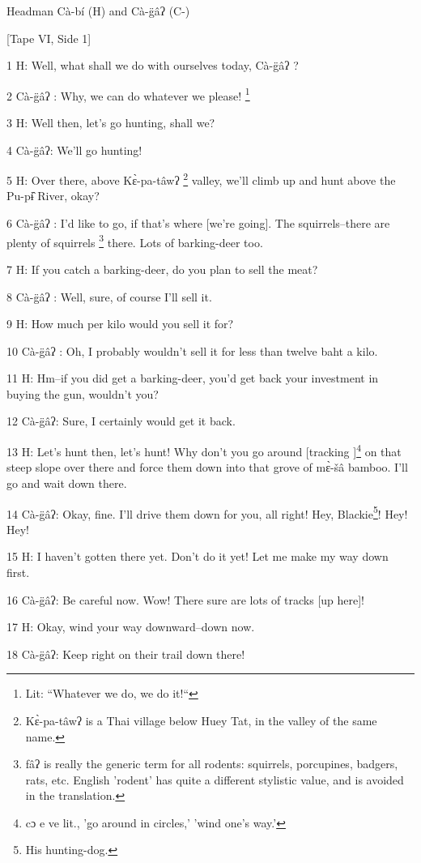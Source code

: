 
Headman Cà-bí (H) and Cà-g̈âʔ (C-)

[Tape VI, Side 1]

1 H: Well, what shall we do with ourselves today, Cà-g̈âʔ ?

2 Cà-g̈âʔ : Why, we can do whatever we please! \footnote{Lit: ``Whatever we do, we do it!``}

3 H: Well then, let's go hunting, shall we?

4 Cà-g̈âʔ: We'll go hunting!

5 H: Over there, above Kɛ̀-pa-tâwʔ \footnote{Kɛ̀-pa-tâwʔ is a Thai village below Huey Tat, in the valley of the same name.} valley, we'll climb up and hunt above
the Pu-pɨ̂ River, okay?

6 Cà-g̈âʔ : I'd like to go, if that's where [we're going]. The squirrels--there
are plenty of squirrels \footnote{fâʔ is really the generic term for all rodents: squirrels, porcupines, badgers, rats, etc. English 'rodent' has quite a different stylistic value, and is avoided in the translation.} there. Lots of barking-deer too.

7 H: If you catch a barking-deer, do you plan to sell the meat?

8 Cà-g̈âʔ : Well, sure, of course I'll sell it.

9 H: How much per kilo would you sell it for?

10 Cà-g̈âʔ : Oh, I probably wouldn't sell it for less than twelve baht a kilo.

11 H: Hm--if you did get a barking-deer, you'd get back your investment in buying
the gun, wouldn't you?

12 Cà-g̈âʔ: Sure, I certainly would get it back.

13 H: Let's hunt then, let's hunt! Why don't you go around [tracking ]\footnote{cɔ e ve lit., 'go around in circles,' 'wind one's way.'} on that
steep slope over there and force them down into that grove of mɛ̀-šâ bamboo.
I'll go and wait down there.

14  Cà-g̈âʔ: Okay, fine. I'll drive them down for you, all right! Hey, Blackie\footnote{His hunting-dog.}!
Hey! Hey!

15 H: I haven't gotten there yet. Don't do it yet! Let me make my way down first.

16  Cà-g̈âʔ: Be careful now. Wow! There sure are lots of tracks [up here]!

17 H: Okay, wind your way downward--down now.

18  Cà-g̈âʔ: Keep right on their trail down there!

